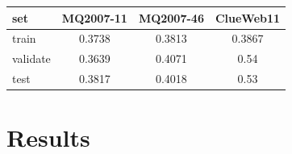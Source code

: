 \begin{center}
  \begin{tabular}{ l | c | c | c}
    set & MQ2007-11 & MQ2007-46 & ClueWeb11  \\
    \hline
    train & 0.3738 & 0.3813 &  0.3867 \\
    validate & 0.3639 & 0.4071 &  0.54\\
    test & 0.3817 & 0.4018 & 0.53\\
    \hline
  \end{tabular}
   \label{tab:countsscoure} 
\end{center}




\section{Results}
